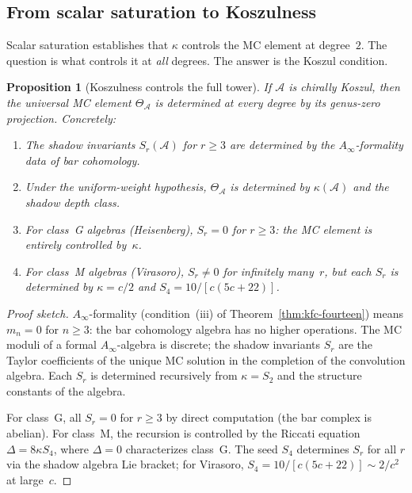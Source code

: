\documentclass[11pt,reqno]{amsart}
\newtheorem{proposition}[theorem]{Proposition}
\theoremstyle{definition}
\theoremstyle{remark}
\newcommand{\cA}{\mathcal{A}}
\newcommand{\Ainfty}{A_\infty}
\numberwithin{equation}{section}
\begin{document}
\subsection{From scalar saturation to Koszulness}

Scalar saturation establishes that $\kappa$ controls the MC element
at degree~$2$. The question is what controls it at \emph{all}
degrees. The answer is the Koszul condition.

\begin{proposition}[Koszulness controls the full tower]
\label{prop:kfc-koszul-controls-tower}
If $\cA$ is chirally Koszul, then the universal MC element
$\Theta_\cA$ is determined at every degree by its genus-zero
projection. Concretely:
\begin{enumerate}
\item The shadow invariants $S_r(\cA)$ for $r \geq 3$ are
  determined by the $\Ainfty$-formality data of bar cohomology.
\item Under the uniform-weight hypothesis, $\Theta_\cA$ is determined
  by $\kappa(\cA)$ and the shadow depth class.
\item For class~G algebras (Heisenberg), $S_r = 0$ for
  $r \geq 3$: the MC element is entirely controlled by~$\kappa$.
\item For class~M algebras (Virasoro), $S_r \neq 0$ for
  infinitely many~$r$, but each $S_r$ is determined by
  $\kappa = c/2$ and $S_4 = 10/[c(5c+22)]$.
\end{enumerate}
\end{proposition}

\begin{proof}[Proof sketch]
$\Ainfty$-formality (condition~(iii) of
Theorem~\ref{thm:kfc-fourteen}) means $m_n = 0$ for $n \geq 3$:
the bar cohomology algebra has no higher operations. The MC moduli
of a formal $\Ainfty$-algebra is discrete; the shadow invariants
$S_r$ are the Taylor coefficients of the unique MC solution
in the completion of the convolution algebra. Each $S_r$ is
determined recursively from $\kappa = S_2$ and the structure
constants of the algebra.

For class~G, all $S_r = 0$ for $r \geq 3$ by direct computation
(the bar complex is abelian).
For class~M, the recursion is controlled by the Riccati equation
$\Delta = 8\kappa S_4$, where
$\Delta = 0$ characterizes class~G. The seed $S_4$ determines
$S_r$ for all $r$ via the shadow algebra Lie bracket; for
Virasoro, $S_4 = 10/[c(5c+22)] \sim 2/c^2$ at large~$c$.
\end{proof}
\end{document}
